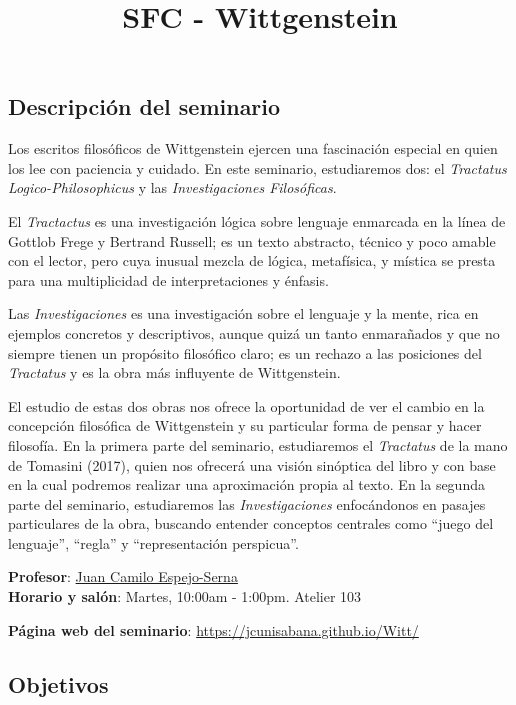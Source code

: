 \documentclass[spanish,]{article}
\title{SFC - Wittgenstein}
\author{}
\date{}
\begin{document}
\maketitle

\subsection{Descripción del seminario}\label{descripcion-del-seminario}

Los escritos filosóficos de Wittgenstein ejercen una fascinación
especial en quien los lee con paciencia y cuidado. En este seminario,
estudiaremos dos: el \emph{Tractatus Logico-Philosophicus} y las
\emph{Investigaciones Filosóficas}.

El \emph{Tractactus} es una investigación lógica sobre lenguaje
enmarcada en la línea de Gottlob Frege y Bertrand Russell; es un texto
abstracto, técnico y poco amable con el lector, pero cuya inusual mezcla
de lógica, metafísica, y mística se presta para una multiplicidad de
interpretaciones y énfasis.

Las \emph{Investigaciones } es una investigación sobre el lenguaje y la
mente, rica en ejemplos concretos y descriptivos, aunque quizá un tanto
enmarañados y que no siempre tienen un propósito filosófico claro; es un
rechazo a las posiciones del \emph{Tractatus} y es la obra más
influyente de Wittgenstein.

El estudio de estas dos obras nos ofrece la oportunidad de ver el cambio
en la concepción filosófica de Wittgenstein y su particular forma de
pensar y hacer filosofía. En la primera parte del seminario,
estudiaremos el \emph{Tractatus} de la mano de Tomasini (2017), quien
nos ofrecerá una visión sinóptica del libro y con base en la cual
podremos realizar una aproximación propia al texto. En la segunda parte
del seminario, estudiaremos las \emph{Investigaciones} enfocándonos en
pasajes particulares de la obra, buscando entender conceptos centrales
como ``juego del lenguaje'', ``regla'' y ``representación perspicua''.

\textbf{Profesor}: \href{../index.html}{Juan Camilo Espejo-Serna}\\
\textbf{Horario y salón}: Martes, 10:00am - 1:00pm. Atelier 103

\textbf{Página web del seminario}:
\url{https://jcunisabana.github.io/Witt/}

\subsection{Objetivos}\label{objetivos}
\end{document}
